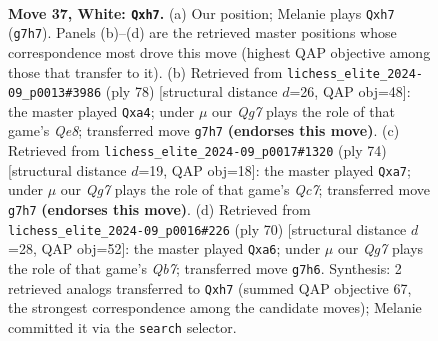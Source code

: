 \documentclass[11pt]{article}
\begin{document}
\clearpage

\begin{figure}[p]\centering
\begin{subfigure}{0.46\textwidth}\centering
\resizebox{\linewidth}{!}{%
\newchessgame
\chessboard[
  setfen={r7/6Qp/3pkp2/8/pq6/6P1/P4P1P/6K1 w - - 0 37},
  showmover=false,
  pgfstyle=straightmove, color=movearrow, markmove={g7-h7}
]}
\caption{}
\end{subfigure}\hfill
\begin{subfigure}{0.46\textwidth}\centering
\resizebox{\linewidth}{!}{%
\newchessgame
\chessboard[
  setfen={4Q3/5pk1/6pp/8/p7/P2qP2P/5PP1/6K1 w - - 5 40},
  showmover=false,
  pgfstyle=straightmove, color=movearrow, markmove={e8-a4}
]}
\caption{}
\end{subfigure}
\\[4pt]
\begin{subfigure}{0.46\textwidth}\centering
\resizebox{\linewidth}{!}{%
\newchessgame
\chessboard[
  setfen={4q3/p1Q5/4p1pk/7p/1P5P/6P1/5P2/6K1 w - - 7 38},
  showmover=false,
  pgfstyle=straightmove, color=movearrow, markmove={c7-a7}
]}
\caption{}
\end{subfigure}\hfill
\begin{subfigure}{0.46\textwidth}\centering
\resizebox{\linewidth}{!}{%
\newchessgame
\chessboard[
  setfen={8/1Q6/p1p3pk/7p/7q/1P6/P5P1/5K2 w - - 0 36},
  showmover=false,
  pgfstyle=straightmove, color=movearrow, markmove={b7-a6}
]}
\caption{}
\end{subfigure}
\caption{\textbf{Move 37, White: \texttt{Qxh7}.} (a) Our position; Melanie plays \texttt{Qxh7} (\texttt{g7h7}). Panels (b)--(d) are the retrieved master positions whose correspondence most drove this move (highest QAP objective among those that transfer to it). (b) Retrieved from \texttt{lichess\_elite\_2024-09\_p0013\#3986} (ply 78) [structural distance $d$=26, QAP obj=48]: the master played \texttt{Qxa4}; under $\mu$ our \emph{Qg7} plays the role of that game's \emph{Qe8}; transferred move \texttt{g7h7} \textbf{(endorses this move)}. (c) Retrieved from \texttt{lichess\_elite\_2024-09\_p0017\#1320} (ply 74) [structural distance $d$=19, QAP obj=18]: the master played \texttt{Qxa7}; under $\mu$ our \emph{Qg7} plays the role of that game's \emph{Qc7}; transferred move \texttt{g7h7} \textbf{(endorses this move)}. (d) Retrieved from \texttt{lichess\_elite\_2024-09\_p0016\#226} (ply 70) [structural distance $d$=28, QAP obj=52]: the master played \texttt{Qxa6}; under $\mu$ our \emph{Qg7} plays the role of that game's \emph{Qb7}; transferred move \texttt{g7h6}. Synthesis: 2 retrieved analogs transferred to \texttt{Qxh7} (summed QAP objective 67, the strongest correspondence among the candidate moves); Melanie committed it via the \texttt{search} selector.}
\label{fig:thought-m72}
\end{figure}
\end{document}
